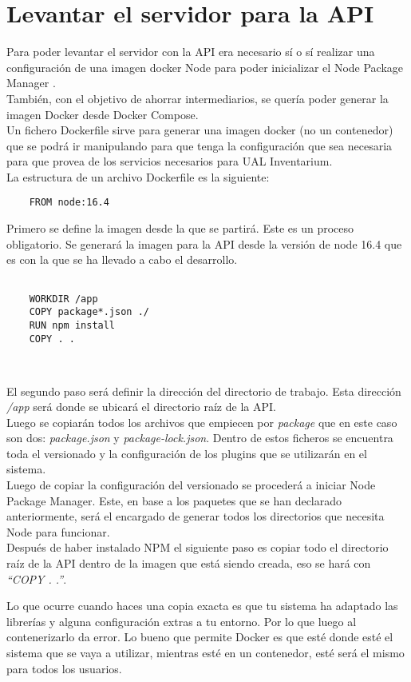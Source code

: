 \section{Levantar el servidor para la API}
Para poder levantar el servidor con la API era necesario sí o sí realizar una configuración de una imagen docker Node para poder inicializar el Node Package Manager \cite{docker-nodejs}.
\\También, con el objetivo de ahorrar intermediarios, se quería poder generar la imagen Docker desde Docker Compose.
\\Un fichero Dockerfile sirve para generar una imagen docker (no un contenedor) que se podrá ir manipulando para que tenga la configuración que sea necesaria para que provea de los servicios necesarios para UAL Inventarium.
\\La estructura de un archivo Dockerfile es la siguiente:
\begin{verbatim}
    FROM node:16.4
\end{verbatim}
Primero se define la imagen desde la que se partirá. Este es un proceso obligatorio. Se generará la imagen para la API desde la versión de node 16.4 que es con la que se ha llevado a cabo el desarrollo.
\begin{verbatim}

    WORKDIR /app
    COPY package*.json ./
    RUN npm install
    COPY . .

    
\end{verbatim}
El segundo paso será definir la dirección del directorio de trabajo. Esta dirección \textit{/app} será donde se ubicará el directorio raíz de la API.
\\Luego se copiarán todos los archivos que empiecen por \textit{package} que en este caso son dos: \textit{package.json} y \textit{package-lock.json}. Dentro de estos ficheros se encuentra toda el versionado y la configuración de los plugins que se utilizarán en el sistema.
\\Luego de copiar la configuración del versionado se procederá a iniciar Node Package Manager. Este, en base a los paquetes que se han declarado anteriormente, será el encargado de generar todos los directorios que necesita Node para funcionar.
\\Después de haber instalado NPM el siguiente paso es copiar todo el directorio raíz de la API dentro de la imagen que está siendo creada, eso se hará con \textit{``COPY . .''}.
\begin{tcolorbox}
    [colback=green!5!white,colframe=green!75!black,fonttitle=\bfseries,title=¿Por qué no se copia directamente el directorio raíz con los plugins y demás?]
    Lo que ocurre cuando haces una copia exacta es que tu sistema ha adaptado las librerías y alguna configuración extras a tu entorno. Por lo que luego al contenerizarlo da error. Lo bueno que permite Docker es que esté donde esté el sistema que se vaya a utilizar, mientras esté en un contenedor, esté será el mismo para todos los usuarios.
\end{tcolorbox}
